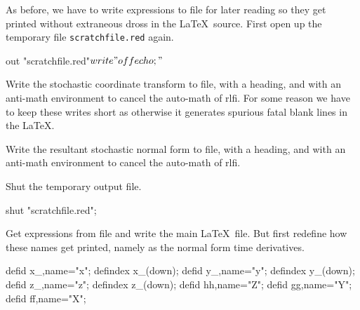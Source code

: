 \documentclass[11pt,a5paper]{article}
\begin{document}
As before, we have to write expressions to file for later
reading so they get printed without extraneous dross in the
\LaTeX\ source. First open up the temporary file
\verb|scratchfile.red| again.
\begin{reduce}
out "scratchfile.red"$
write "off echo;"$ %
\end{reduce}

Write the stochastic coordinate transform to file, with a
heading, and with an anti-math environment to cancel the
auto-math of rlfi. For some reason we have to keep these
writes short as otherwise it generates spurious fatal
blank lines in the \LaTeX.

Write the resultant stochastic normal form to file, with a
heading, and with an anti-math environment to cancel the
auto-math of rlfi.

Shut the temporary output file.
\begin{reduce}
shut "scratchfile.red";
\end{reduce}

Get expressions from file and write the main \LaTeX\ file.
But first redefine how these names get printed, namely as
the normal form time derivatives. 
\begin{reduce}
defid x_,name="x"; defindex x_(down);
defid y_,name="y"; defindex y_(down);
defid z_,name="z"; defindex z_(down);
defid hh,name="\dot Z";
defid gg,name="\dot Y";
defid ff,name="\dot X";
\end{reduce}
\end{document}
